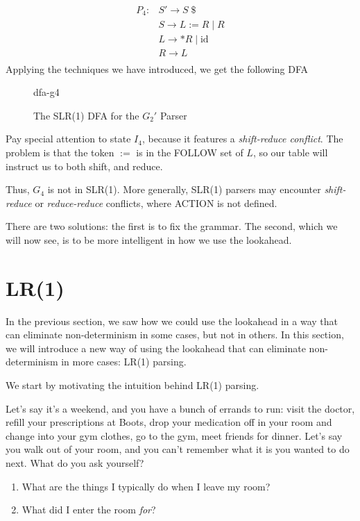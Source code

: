 \[
\begin{array}{ll}
  P_4: & S' \to S\; \$ \\
&   S \to L := R \mid R \\
&   L \to * R \mid \text{id} \\
&   R \to L\\
\end{array}
\]
Applying the techniques we have introduced, we get the following DFA
\begin{figure}[H]
    \centering
    {dfa-g4}
    \caption{The SLR(1) DFA for the $G_2'$ Parser}
    \label{fig:dfa-g4}
\end{figure}

Pay special attention to state $I_4$, because it features a \textit{shift-reduce conflict}. The problem is that the token $:=$ is in the FOLLOW set of $L$, so our table will instruct us to both shift, and reduce. 

Thus, $G_4$ is not in SLR(1). More generally, SLR(1) parsers may encounter \textit{shift-reduce} or \textit{reduce-reduce} conflicts, where ACTION is not defined. 

There are two solutions: the first is to fix the grammar. The second, which we will now see, is to be more intelligent in how we use the lookahead. 

\section{LR(1)}\label{section:lr1}
In the previous section, we saw how we could use the lookahead in a way that can eliminate non-determinism in some cases, but not in others. In this section, we will introduce a new way of using the lookahead that can eliminate non-determinism in more cases: LR(1) parsing.

We start by motivating the intuition behind LR(1) parsing. 

Let's say it's a weekend, and you have a bunch of errands to run: visit the doctor, refill your prescriptions at Boots, drop your medication off in your room and change into your gym clothes, go to the gym, meet friends for dinner. Let's say you walk out of your room, and you can't remember what it is you wanted to do next. What do you ask yourself?

\begin{enumerate}
    \item What are the things I typically do when I leave my room?
    \item What did I enter the room \textit{for}?
\end{enumerate}

